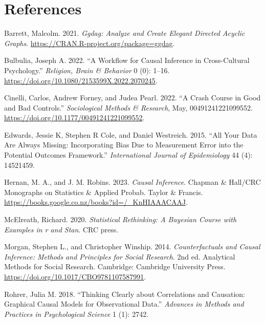 \documentclass[
  singlecolumn]{report}
\newlength{\cslhangindent}
\newlength{\cslentryspacingunit} %
\newenvironment{CSLReferences}[2] %
 {%
  \setlength{\parindent}{0pt}
  \ifodd #1
  \let\oldpar\par
  \def\par{\hangindent=\cslhangindent\oldpar}
  \fi
  \setlength{\parskip}{#2\cslentryspacingunit}
 }%
 {}
\begin{document}
\hypertarget{references}{%
\section*{References}\label{references}}

\hypertarget{refs}{}
\begin{CSLReferences}{1}{0}
\leavevmode{}%
Barrett, Malcolm. 2021. \emph{Ggdag: Analyze and Create Elegant Directed
Acyclic Graphs}. \url{https://CRAN.R-project.org/package=ggdag}.

\leavevmode{}%
Bulbulia, Joseph A. 2022. {``A Workflow for Causal Inference in
Cross-Cultural Psychology.''} \emph{Religion, Brain \& Behavior} 0 (0):
1--16. \url{https://doi.org/10.1080/2153599X.2022.2070245}.

\leavevmode{}%
Cinelli, Carlos, Andrew Forney, and Judea Pearl. 2022. {``A Crash Course
in Good and Bad Controls.''} \emph{Sociological Methods \& Research},
May, 00491241221099552. \url{https://doi.org/10.1177/00491241221099552}.

\leavevmode{}%
Edwards, Jessie K, Stephen R Cole, and Daniel Westreich. 2015. {``All
Your Data Are Always Missing: Incorporating Bias Due to Measurement
Error into the Potential Outcomes Framework.''} \emph{International
Journal of Epidemiology} 44 (4): 14521459.

\leavevmode{}%
Hernan, M. A., and J. M. Robins. 2023. \emph{Causal Inference}. Chapman
\& Hall/CRC Monographs on Statistics \& Applied Probab. Taylor \&
Francis. \url{https://books.google.co.nz/books?id=/_KnHIAAACAAJ}.

\leavevmode{}%
McElreath, Richard. 2020. \emph{Statistical Rethinking: A Bayesian
Course with Examples in r and Stan}. CRC press.

\leavevmode{}%
Morgan, Stephen L., and Christopher Winship. 2014. \emph{Counterfactuals
and Causal Inference: Methods and Principles for Social Research}. 2nd
ed. Analytical Methods for Social Research. Cambridge: Cambridge
University Press. \url{https://doi.org/10.1017/CBO9781107587991}.

\leavevmode{}%
Rohrer, Julia M. 2018. {``Thinking Clearly about Correlations and
Causation: Graphical Causal Models for Observational Data.''}
\emph{Advances in Methods and Practices in Psychological Science} 1 (1):
2742.


\end{CSLReferences}
\end{document}
